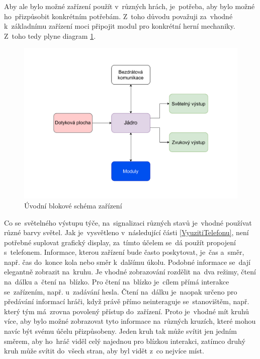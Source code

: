 Aby ale bylo možné zařízení použít v~různých hrách, je~potřeba, aby bylo možné ho~přizpůsobit konkrétním potřebám.
Z~toho důvodu považuji za~vhodné k~základnímu zařízení moci připojit modul pro konkrétní herní mechaniky.
Z~toho tedy plyne diagram \ref{fig:diagram_zanoreni_0}.
\begin{figure}[h]
    \centering
    \includegraphics[width=\textwidth]{text/TeoretickyUvod/AplikaceHernichZarizeni/diagram/zanoreni_0.pdf}
    \caption{Úvodní blokové schéma zařízení}
    \label{fig:diagram_zanoreni_0}
\end{figure}

Co se~světelného výstupu týče, na~signalizaci různých stavů je~vhodné používat různé barvy světel.
Jak je~vysvětleno v~následující části \ref{VyuzitiTelefonu}, není potřebné suplovat grafický display, za~tímto účelem se~dá použít propojení s~telefonem.
Informace, kterou zařízení bude často poskytovat, je~čas a~směr, např. čas do~konce kola nebo směr k~dalšímu úkolu.
Podobné informace se~dají elegantně zobrazit na~kruhu.
Je vhodné zobrazování rozdělit na~dva režimy, čtení na~dálku a~čtení na~blízko.
Pro čtení na~blízko je~cílem přímá interakce se~zařízením, např. u~zadávání hesla.
Čtení na~dálku je~naopak určeno pro předávání informací hráči, když právě přímo neinteraguje se~stanovištěm, např. který tým má~zrovna povolený přístup do~zařízení.
Proto je~vhodné mít kruhů více, aby bylo možné zobrazovat tyto informace na~různých kruzích, které mohou navíc být svému účelu přizpůsobeny.
Jeden kruh tak může svítit jen jedním směrem, aby ho~hráč viděl celý najednou pro blízkou interakci, zatímco druhý kruh může svítit do~všech stran, aby byl vidět z~co nejvíce míst.

